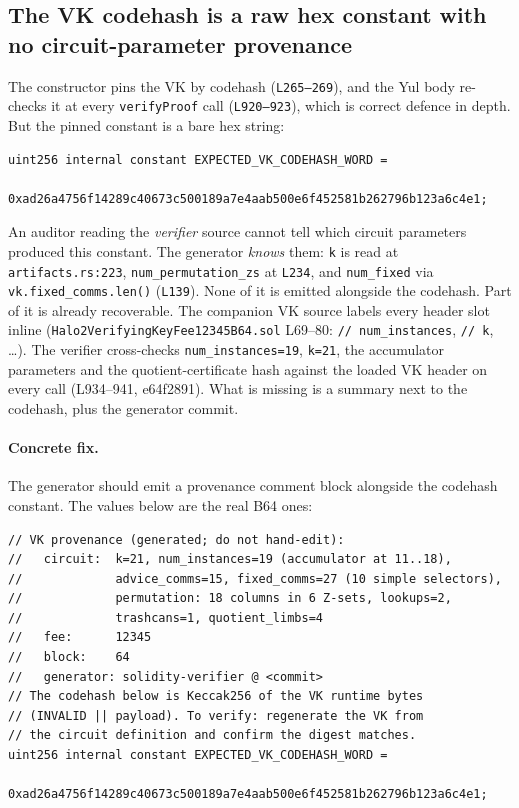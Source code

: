\subsection{The VK codehash is a raw hex constant with no circuit-parameter provenance}
\label{sec:pr-codehash-prov}

The constructor pins the VK by codehash (\texttt{L265--269}), and
the Yul body re-checks it at every \texttt{verifyProof} call
(\texttt{L920--923}), which is correct defence in depth. But the
pinned constant is a bare hex string:

\begin{lstlisting}[style=plain]
uint256 internal constant EXPECTED_VK_CODEHASH_WORD =
    0xad26a4756f14289c40673c500189a7e4aab500e6f452581b262796b123a6c4e1;
\end{lstlisting}

An auditor reading the \emph{verifier} source cannot tell which
circuit parameters produced this constant. The generator
\emph{knows} them: \texttt{k} is read at \texttt{artifacts.rs:223},
\texttt{num\_\allowbreak{}permutation\_\allowbreak{}zs} at \texttt{L234}, and
\texttt{num\_fixed} via \texttt{vk.fixed\_\allowbreak{}comms.len()}
(\texttt{L139}). None of it is emitted alongside the codehash.
 Part of it is already recoverable. The companion
VK source labels every header slot inline
(\texttt{Halo2VerifyingKeyFee12345B64.sol} L69--80: \texttt{//
num\_instances}, \texttt{// k}, \ldots). The verifier cross-checks
\texttt{num\_instances=19}, \texttt{k=21}, the accumulator
parameters and the quotient-certificate hash against the loaded VK
header on every call (L934--941, e64f2891). What is missing is a
summary next to the codehash, plus the generator commit.

\paragraph{Concrete fix.} The generator should emit a provenance
comment block alongside the codehash constant. The values below
are the real B64 ones:

\begin{lstlisting}[style=plain]
// VK provenance (generated; do not hand-edit):
//   circuit:  k=21, num_instances=19 (accumulator at 11..18),
//             advice_comms=15, fixed_comms=27 (10 simple selectors),
//             permutation: 18 columns in 6 Z-sets, lookups=2,
//             trashcans=1, quotient_limbs=4
//   fee:      12345
//   block:    64
//   generator: solidity-verifier @ <commit>
// The codehash below is Keccak256 of the VK runtime bytes
// (INVALID || payload). To verify: regenerate the VK from
// the circuit definition and confirm the digest matches.
uint256 internal constant EXPECTED_VK_CODEHASH_WORD =
    0xad26a4756f14289c40673c500189a7e4aab500e6f452581b262796b123a6c4e1;
\end{lstlisting}

